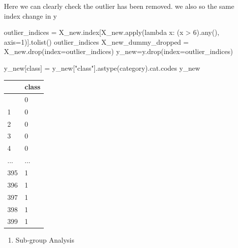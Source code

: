 \documentclass[
  11pt,
  letterpaper,
  DIV=11,
  numbers=noendperiod]{scrartcl}
\newenvironment{Shaded}{\begin{snugshade}}{\end{snugshade}}
\newcommand{\BuiltInTok}[1]{\textcolor[rgb]{0.00,0.23,0.31}{#1}}
\newcommand{\DecValTok}[1]{\textcolor[rgb]{0.68,0.00,0.00}{#1}}
\newcommand{\KeywordTok}[1]{\textcolor[rgb]{0.00,0.23,0.31}{#1}}
\newcommand{\NormalTok}[1]{\textcolor[rgb]{0.00,0.23,0.31}{#1}}
\newcommand{\OperatorTok}[1]{\textcolor[rgb]{0.37,0.37,0.37}{#1}}
\newcommand{\StringTok}[1]{\textcolor[rgb]{0.13,0.47,0.30}{#1}}
\providecommand{\tightlist}{%
  \setlength{\itemsep}{0pt}\setlength{\parskip}{0pt}}\usepackage{longtable,booktabs,array}
\begin{document}
Here we can clearly check the outlier has been removed. we also so the
same index change in y

\begin{Shaded}
\begin{Highlighting}[]
\NormalTok{outlier\_indices }\OperatorTok{=}\NormalTok{ X\_new.index[X\_new.}\BuiltInTok{apply}\NormalTok{(}\KeywordTok{lambda}\NormalTok{ x: (x }\OperatorTok{\textgreater{}} \DecValTok{6}\NormalTok{).}\BuiltInTok{any}\NormalTok{(), axis}\OperatorTok{=}\DecValTok{1}\NormalTok{)].tolist() }
\NormalTok{outlier\_indices}
\NormalTok{X\_new\_dummy\_dropped }\OperatorTok{=}\NormalTok{ X\_new.drop(index}\OperatorTok{=}\NormalTok{outlier\_indices)}
\NormalTok{y\_new}\OperatorTok{=}\NormalTok{y.drop(index}\OperatorTok{=}\NormalTok{outlier\_indices)}
\end{Highlighting}
\end{Shaded}

\begin{Shaded}
\begin{Highlighting}[]
\NormalTok{y\_new[}\StringTok{\textquotesingle{}class\textquotesingle{}}\NormalTok{] }\OperatorTok{=}\NormalTok{ y\_new[}\StringTok{"class"}\NormalTok{].astype(}\StringTok{\textquotesingle{}category\textquotesingle{}}\NormalTok{).cat.codes}
\NormalTok{y\_new}
\end{Highlighting}
\end{Shaded}

\begin{longtable}[]{@{}ll@{}}
\toprule\noalign{}
& class \\
\midrule\noalign{}
\endhead
\bottomrule\noalign{}
\endlastfoot
0 & 0 \\
1 & 0 \\
2 & 0 \\
3 & 0 \\
4 & 0 \\
... & ... \\
395 & 1 \\
396 & 1 \\
397 & 1 \\
398 & 1 \\
399 & 1 \\
\end{longtable}

\begin{enumerate}
\def\labelenumi{\arabic{enumi}.}
\setcounter{enumi}{6}
\tightlist
\item
  Sub-group Analysis
\end{enumerate}
\end{document}
